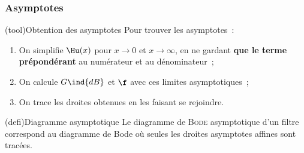 \documentclass[../../main/main.tex]{subfiles}
\begin{document}
\subsubsection{Asymptotes}
\begin{tcb*}(tool){Obtention des asymptotes}
	Pour trouver les asymptotes~:
	\begin{enumerate}
		\item On simplifie $\Hu(x)$ pour $x\to 0$ et $x\to \infty$, en ne gardant
		      \textbf{que le terme prépondérant} au numérateur et au dénominateur~;
		\item On calcule $G\ind{dB}$ et $\f$ avec ces limites asymptotiques~;
		\item On trace les droites obtenues en les faisant se rejoindre.
	\end{enumerate}
\end{tcb*}
\begin{tcb}(defi){Diagramme asymptotique}
	Le diagramme de \textsc{Bode} asymptotique d'un filtre correspond au diagramme de Bode
	où seules les droites asymptotes affines sont tracées.
\end{tcb}
\end{document}
